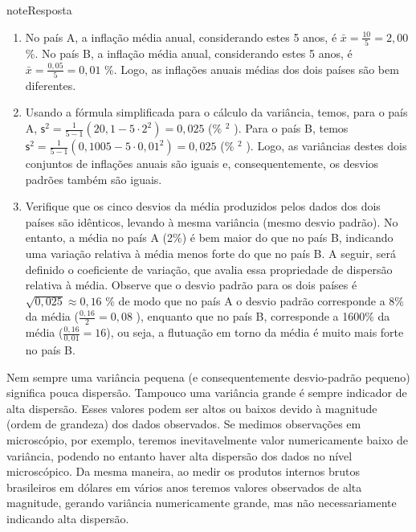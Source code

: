 \begin{sphinxadmonition}{note}{Resposta}
\begin{enumerate}
\item {} 
No país A, a inflação média anual, considerando estes 5 anos, é    \(\bar{x}=\frac{10}{5}=2,00\) \%. No país B, a inflação média anual, considerando estes 5 anos, é \(\bar{x}=\frac{0,05}{5}=0,01\) \%. Logo, as inflações anuais médias dos dois países são bem diferentes.

\item {} 
Usando a fórmula simplificada para o cálculo da variância, temos, para o país A, \(\textsf{s}^2=\frac{1}{5-1}\left (20,1-5\cdot 2^2\right )= 0,025\) (\% \(^2\) ). Para o país B, temos \(\textsf{s}^2=\frac{1}{5-1}\left (0,1005-5\cdot 0,01^2\right )= 0,025\) (\% \(^2\) ). Logo, as variâncias destes dois conjuntos de inflações anuais são iguais e, consequentemente, os desvios padrões também são iguais.

\item {} 
Verifique que os cinco desvios da média produzidos pelos dados dos dois países são idênticos, levando à mesma variância (mesmo desvio padrão). No entanto, a média no país A (2\%) é bem maior do que no país B, indicando uma variação relativa à média menos forte do que no país B. A seguir, será definido o coeficiente de variação, que avalia essa propriedade de dispersão relativa à média. Observe que o desvio padrão para os dois países é  \(\sqrt{0,025}\approx 0,16\) \% de modo que no país A o desvio padrão corresponde a 8\% da média (\(\frac{0,16}{2}=0,08\) ), enquanto que no país B, corresponde a 1600\% da média (\(\frac{0,16}{0,01}=16\)), ou seja, a flutuação em torno da média é muito mais forte no país B.

\end{enumerate}
\end{sphinxadmonition}


Nem sempre uma variância pequena (e consequentemente desvio-padrão pequeno) significa pouca dispersão. Tampouco uma variância grande é sempre indicador de alta dispersão. Esses valores podem ser altos ou baixos devido à magnitude (ordem de grandeza) dos dados observados. Se medimos observações em microscópio, por exemplo, teremos inevitavelmente valor numericamente baixo de variância, podendo no entanto haver alta dispersão dos dados no nível microscópico. Da mesma maneira, ao medir os produtos internos brutos brasileiros em dólares em vários anos teremos valores observados de alta magnitude, gerando variância numericamente grande, mas não necessariamente indicando alta dispersão.

